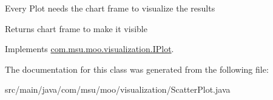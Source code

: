Every Plot needs the chart frame to visualize the results \begin{DoxyReturn}{Returns}
chart frame to make it visible 
\end{DoxyReturn}


Implements \hyperlink{interfacecom_1_1msu_1_1moo_1_1visualization_1_1IPlot_ae45c2987d112fbf5bc5af7864fb50ecd}{com.\-msu.\-moo.\-visualization.\-I\-Plot}.



The documentation for this class was generated from the following file\-:\begin{DoxyCompactItemize}
\item 
src/main/java/com/msu/moo/visualization/Scatter\-Plot.\-java\end{DoxyCompactItemize}
